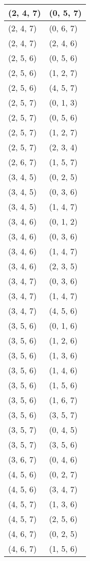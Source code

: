 \begin{footnotesize}
\begin{longtable}[c]{|l|l|}
(2, 4, 7)
&(0, 5, 7)
\\ \hline
(2, 4, 7)
&(0, 6, 7)
\\ \hline
(2, 4, 7)
&(2, 4, 6)
\\ \hline
(2, 5, 6)
&(0, 5, 6)
\\ \hline
(2, 5, 6)
&(1, 2, 7)
\\ \hline
(2, 5, 6)
&(4, 5, 7)
\\ \hline
(2, 5, 7)
&(0, 1, 3)
\\ \hline
(2, 5, 7)
&(0, 5, 6)
\\ \hline
(2, 5, 7)
&(1, 2, 7)
\\ \hline
(2, 5, 7)
&(2, 3, 4)
\\ \hline
(2, 6, 7)
&(1, 5, 7)
\\ \hline
(3, 4, 5)
&(0, 2, 5)
\\ \hline
(3, 4, 5)
&(0, 3, 6)
\\ \hline
(3, 4, 5)
&(1, 4, 7)
\\ \hline
(3, 4, 6)
&(0, 1, 2)
\\ \hline
(3, 4, 6)
&(0, 3, 6)
\\ \hline
(3, 4, 6)
&(1, 4, 7)
\\ \hline
(3, 4, 6)
&(2, 3, 5)
\\ \hline
(3, 4, 7)
&(0, 3, 6)
\\ \hline
(3, 4, 7)
&(1, 4, 7)
\\ \hline
(3, 4, 7)
&(4, 5, 6)
\\ \hline
(3, 5, 6)
&(0, 1, 6)
\\ \hline
(3, 5, 6)
&(1, 2, 6)
\\ \hline
(3, 5, 6)
&(1, 3, 6)
\\ \hline
(3, 5, 6)
&(1, 4, 6)
\\ \hline
(3, 5, 6)
&(1, 5, 6)
\\ \hline
(3, 5, 6)
&(1, 6, 7)
\\ \hline
(3, 5, 6)
&(3, 5, 7)
\\ \hline
(3, 5, 7)
&(0, 4, 5)
\\ \hline
(3, 5, 7)
&(3, 5, 6)
\\ \hline
(3, 6, 7)
&(0, 4, 6)
\\ \hline
(4, 5, 6)
&(0, 2, 7)
\\ \hline
(4, 5, 6)
&(3, 4, 7)
\\ \hline
(4, 5, 7)
&(1, 3, 6)
\\ \hline
(4, 5, 7)
&(2, 5, 6)
\\ \hline
(4, 6, 7)
&(0, 2, 5)
\\ \hline
(4, 6, 7)
&(1, 5, 6)
\\ \hline

\end{longtable}
\end{footnotesize}
